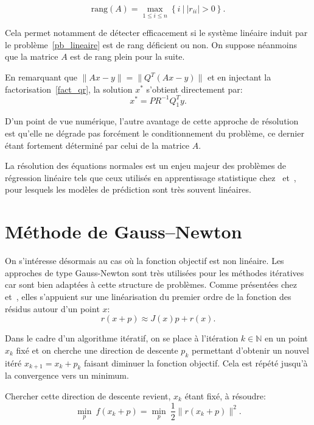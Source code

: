 \begin{equation}\label{calcul rang}
  \text{rang}(A)= \underset{1\leq i\leq n}{\max} \left\{ i\ | \ |r_{ii}| > 0\right\}.
\end{equation}

Cela permet notamment de détecter efficacement si le système linéaire induit par le problème~\eqref{pb_lineaire} est de rang déficient ou non.
On suppose néanmoins que la matrice $A$ est de rang plein pour la suite.

En remarquant que $\|Ax-y\|=\|Q^T(Ax-y)\|$ et en injectant la factorisation~\eqref{fact_qr}, la solution $x^*$ s'obtient directement par:
\[
x^* = PR^{-1}Q_1^Ty.
\]

D'un point de vue numérique, l'autre avantage de cette approche de résolution est qu'elle ne dégrade pas forcément le conditionnement du problème, 
ce dernier étant fortement déterminé par celui de la matrice $A$.

La résolution des équations normales est un enjeu majeur des problèmes de régression linéaire tels que ceux utilisés en apprentissage statistique 
chez~\citet{eslii09} et~\citet{johnson08}, pour lesquels les modèles de prédiction sont très souvent linéaires. 

\section{Méthode de Gauss--Newton}\label{edart:method_gn}

On s'intéresse désormais au cas où la fonction objectif est non linéaire. Les approches de type Gauss-Newton sont très utilisées pour les méthodes 
itératives car sont bien adaptées à cette structure de problèmes. Comme présentées chez~\citet{dennschn96} et~\citet{nocewrig99}, 
elles s'appuient sur une linéarisation du premier ordre de la fonction des résidus autour d'un point $x$:
\begin{equation}\label{linear_res}
r(x+p) \approx J(x)p + r(x).
\end{equation}

Dans le cadre d'un algorithme itératif, on se place à l'itération $k\in \mathbb{N}$ en un point $x_k$ fixé et on cherche une direction de descente $p_k$ 
permettant d'obtenir un nouvel itéré $x_{k+1}=x_k+p_k$ faisant diminuer la fonction objectif. Cela est répété jusqu'à la convergence vers un minimum.

Chercher cette direction de descente revient, $x_k$ étant fixé, à résoudre:
\[
\underset{p}{\min}\ f(x_k+p) = \underset{p}{\min}\ \dfrac{1}{2}\|r(x_k+p)\|^2.
\]

